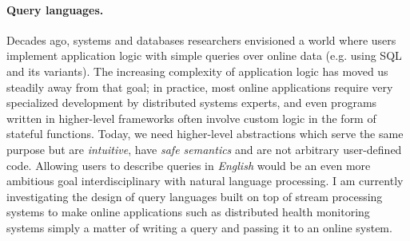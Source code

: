 \paragraph*{Query languages.}
Decades ago, systems and databases researchers envisioned a world where users implement application logic with simple queries over online data (e.g. using SQL and its variants). The increasing complexity of application logic has moved us steadily away from that goal; in practice, most online applications require very specialized development by distributed systems experts, and even programs written in higher-level frameworks often involve custom logic in the form of stateful functions. Today, we need higher-level abstractions which serve the same purpose but are \emph{intuitive}, have \emph{safe semantics} and are not arbitrary user-defined code.
Allowing users to describe queries in \emph{English} would be an even more ambitious goal interdisciplinary with natural language processing.
I am currently investigating the design of query languages built on top of stream processing systems to make online applications such as distributed health monitoring systems
simply a matter of writing a query and passing it to an online system.
